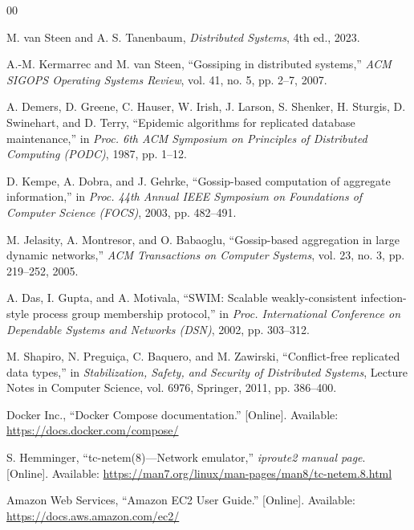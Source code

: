 \documentclass[conference]{IEEEtran}
\begin{document}
\balance


\begin{thebibliography}{00}

M. van Steen and A. S. Tanenbaum,
\emph{Distributed Systems}, 4th ed., 2023.

A.-M. Kermarrec and M. van Steen,
``Gossiping in distributed systems,''
\emph{ACM SIGOPS Operating Systems Review},
vol. 41, no. 5, pp. 2--7, 2007.

A. Demers, D. Greene, C. Hauser, W. Irish, J. Larson, S. Shenker,
H. Sturgis, D. Swinehart, and D. Terry,
``Epidemic algorithms for replicated database maintenance,''
in \emph{Proc. 6th ACM Symposium on Principles of Distributed Computing (PODC)},
1987, pp. 1--12.

D. Kempe, A. Dobra, and J. Gehrke,
``Gossip-based computation of aggregate information,''
in \emph{Proc. 44th Annual IEEE Symposium on Foundations of Computer Science (FOCS)},
2003, pp. 482--491.

M. Jelasity, A. Montresor, and O. Babaoglu,
``Gossip-based aggregation in large dynamic networks,''
\emph{ACM Transactions on Computer Systems},
vol. 23, no. 3, pp. 219--252, 2005.

A. Das, I. Gupta, and A. Motivala,
``SWIM: Scalable weakly-consistent infection-style process group membership protocol,''
in \emph{Proc. International Conference on Dependable Systems and Networks (DSN)},
2002, pp. 303--312.

M. Shapiro, N. Preguiça, C. Baquero, and M. Zawirski,
``Conflict-free replicated data types,''
in \emph{Stabilization, Safety, and Security of Distributed Systems},
Lecture Notes in Computer Science, vol. 6976,
Springer, 2011, pp. 386--400.

Docker Inc.,
``Docker Compose documentation.''
[Online]. Available: \url{https://docs.docker.com/compose/}

S. Hemminger,
``tc-netem(8)---Network emulator,''
\emph{iproute2 manual page}.
[Online]. Available: \url{https://man7.org/linux/man-pages/man8/tc-netem.8.html}

Amazon Web Services,
``Amazon EC2 User Guide.''
[Online]. Available: \url{https://docs.aws.amazon.com/ec2/}

\end{thebibliography}
\end{document}

